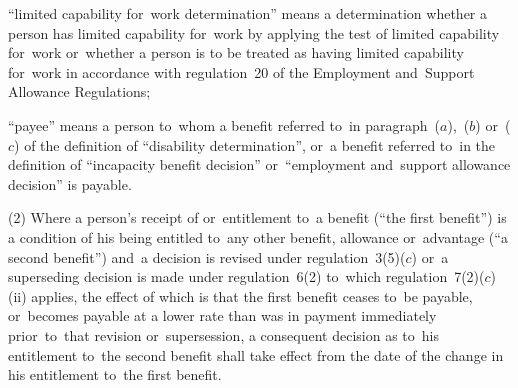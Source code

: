 \documentclass[12pt,a4paper]{article}
\begin{document}
\begin{enumerate}
“limited capability for~work determination” means a determination whether a person has limited capability for~work by applying the test of limited capability for~work or~whether a person is to be treated as having limited capability for~work in accordance with regulation~20 of the Employment and~Support Allowance Regulations;

“payee” means a person to~whom a benefit referred to~in paragraph~($a$),~($b$) or~($c$) of the definition of “disability determination”, or~a benefit referred to~in the definition of “incapacity benefit decision” 
or~“employment and~support allowance decision”  %
is payable.
\end{enumerate}

(2) Where a person’s receipt of or~entitlement to~a benefit (“the first benefit”) is a condition of his being entitled to~any other benefit, allowance or~advantage (“a second benefit”) and~a decision is revised under regulation~3(5)($c$) or~a superseding decision is made under regulation~6(2) to~which regulation~7(2)($c$)(ii) applies, the effect of which is that the first benefit ceases to~be payable, or~becomes payable at a lower rate than was in payment immediately prior~to~that revision or~supersession, a consequent decision as to~his entitlement to~the second benefit shall take effect from the date of the change in his entitlement to~the first benefit.

\end{document}
